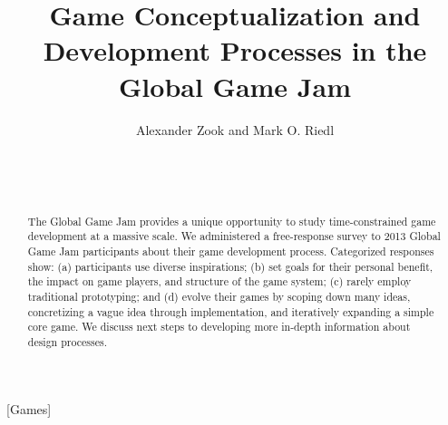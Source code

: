 \documentclass{sig-alternate}
\begin{document}

\title{Game Conceptualization and Development Processes in the Global Game Jam}

\author{}
\author{
\alignauthor
Alexander Zook and Mark O. Riedl\\
       \\
       \\
       \\
}

\maketitle
\begin{abstract}
The Global Game Jam provides a unique opportunity to study time-constrained game development at a massive scale.
We administered a free-response survey to 2013 Global Game Jam participants about their game development process.
Categorized responses show: 
(a) participants use diverse inspirations; 
(b) set goals for their personal benefit, the impact on game players, and structure of the game system; 
(c) rarely employ traditional prototyping; and 
(d) evolve their games by scoping down many ideas, concretizing a vague idea through implementation, and iteratively expanding a simple core game.
We discuss next steps to developing more in-depth information about design processes.
\end{abstract}

[Games]
\end{document}
